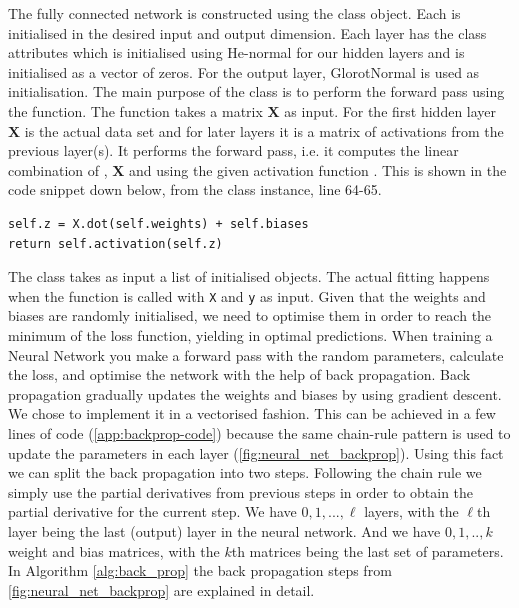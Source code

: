 \documentclass[../main.tex]{subfiles}
\begin{document}
The fully connected network  
is constructed using the  class object.
Each  is initialised in the desired 
input and output dimension. 
Each layer has the class attributes  
which is initialised using He-normal for our hidden layers 
and  is initialised as a vector of zeros. 
For the output layer, GlorotNormal is used as initialisation. 
The main purpose of the  class is to 
perform the forward pass using the  
function. 
The function takes a matrix $\mathbf{X}$ as input. For the first 
hidden layer $\mathbf{X}$ is the actual data set and for later 
layers it is a matrix of activations from the previous layer(s). 
It performs the forward pass, i.e. it computes the 
linear combination of , $\mathbf{X}$ and 
 using the given activation function 
. This is shown in the code snippet 
down below, from the  class instance, 
line 64-65.

\begin{verbatim}
self.z = X.dot(self.weights) + self.biases
return self.activation(self.z)
\end{verbatim}

The  class takes as input a 
list of initialised  objects. The 
actual fitting happens when the function  is 
called with \texttt{X} and \texttt{y} as input. 
Given that the weights and biases are randomly initialised, we 
need to optimise them in order to reach the minimum of the loss 
function, yielding in optimal predictions. When training a Neural 
Network you make a forward pass with the random parameters, 
calculate the loss, and optimise the network with the help of 
back propagation.
Back propagation gradually updates the weights and biases by 
using gradient descent. We chose to implement it in a vectorised 
fashion. This can be achieved in a few lines of code 
(\autoref{app:backprop-code}) because the same chain-rule pattern 
is used to update the parameters in each layer 
(\autoref{fig:neural_net_backprop}). 
Using this fact we can split the back propagation into two steps. 
Following the chain rule we simply use the partial derivatives 
from previous steps in order to obtain the partial derivative for 
the current step. 
We have $0,1,...,\ell$ layers, with the $\ell$th layer being the 
last (output) layer in the neural network. And we have $0,1,..,k$ 
weight and bias matrices, with the $k$th matrices being the last 
set of parameters. In Algorithm \ref{alg:back_prop} the back 
propagation steps from \autoref{fig:neural_net_backprop} are 
explained in detail. 
 
\end{document}
